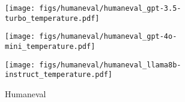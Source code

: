 \begin{figure*}[ht]
    \begin{subfigure}%
        \centering
        \begin{minipage}{0.32\textwidth}
            \centering
            \texttt{[image: figs/humaneval/humaneval\_gpt-3.5-turbo\_temperature.pdf]}
        \end{minipage}
        \begin{minipage}{0.32\textwidth}
            \centering
            \texttt{[image: figs/humaneval/humaneval\_gpt-4o-mini\_temperature.pdf]}
        \end{minipage}
        \begin{minipage}{0.32\textwidth}
            \centering
            \texttt{[image: figs/humaneval/humaneval\_llama8b-instruct\_temperature.pdf]}
        \end{minipage}
        {\footnotesize Humaneval}
    \end{subfigure}
    
    \caption{Scaling curves of \texttt{GPT-3.5-Turbo}, \texttt{GPT-4o-mini}, and \texttt{Llama-3.1-8B-Instruct} across different temperatures on the MMLU-Pro, GSM-Hard, and Humaneval benchmark.}
    \label{fig:temp_mmlu}
\end{figure*}